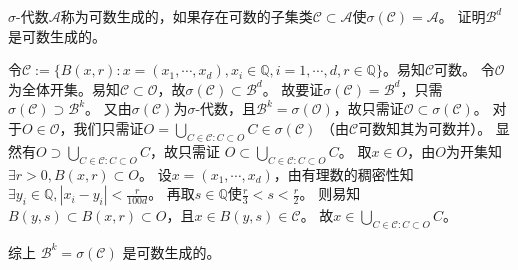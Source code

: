 \documentclass{ctexart}
\begin{document}
\begin{problem}\label{pro:1.4.4}
  \(\sigma \)-代数\(\mathcal{A} \)称为可数生成的，如果存在可数的子集类\(\mathcal{C} \subset \mathcal{A} \)使\(\sigma(\mathcal{C})=\mathcal{A} \)。
  证明\(\mathcal{B}^d \)是可数生成的。
\end{problem}
\begin{solution}
  令\(\mathcal{C}:=\{B(x,r):x=(x_1,\cdots,x_d),x_i \in \mathbb{Q},i=1,\cdots,d, r \in \mathbb{Q}\} \)。易知\(\mathcal{C} \)可数。
  令\(\mathcal{O} \)为全体开集。易知\(\mathcal{C} \subset \mathcal{O} \)，故\(\sigma(\mathcal{C}) \subset \mathcal{B}^d \)。
  故要证\(\sigma(\mathcal{C})=\mathcal{B}^d \)，只需\(\sigma(\mathcal{C}) \supset \mathcal{B}^k \)。
  又由\(\sigma(\mathcal{C}) \)为\(\sigma \)-代数，且\(\mathcal{B}^k=\sigma(\mathcal{O}) \)，故只需证\(\mathcal{O} \subset \sigma(\mathcal{C}) \)。
  对于\(O \in \mathcal{O}\)，我们只需证\(O = \bigcup_{C \in \mathcal{C}:C \subset O} C \in \sigma(\mathcal{C}) \) （由\(\mathcal{C} \)可数知其为可数并）。
  显然有\( O \supset \bigcup_{C \in \mathcal{C}:C \subset O} C \)，故只需证
  \( O \subset \bigcup_{C \in \mathcal{C}:C \subset O} C  \)。
  取\(x \in O \)，由\(O \)为开集知\(\exists r >0,B(x,r) \subset O \)。
  设\(x=(x_1,\cdots,x_d) \)，由有理数的稠密性知\(\exists y_i \in \mathbb{Q},|x_i-y_i| < \frac{r}{100d} \)。
  再取\(s \in \mathbb{Q} \)使\(\frac{r}{3} < s < \frac{r}{2} \)。
  则易知\(B(y,s) \subset B(x,r) \subset O \)，且\(x \in B(y,s) \in \mathcal{C} \)。
  故\(x \in \bigcup_{C \in \mathcal{C}:C \subset O} C \)。

  综上 \(\mathcal{B}^k=\sigma(\mathcal{C}) \) 是可数生成的。
\end{solution}
\end{document}
